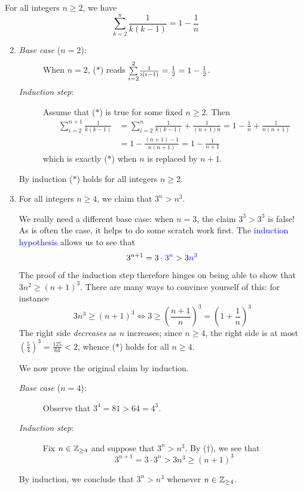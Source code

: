 \begin{examples}{}{}
	\exstart For all integers $n\ge 2$, we have\footnotemark
	\[
		\sum\limits_{k=2}^n\frac 1{k(k-1)} =1-\frac 1n\tag{$\ast$}
	\]	
	\begin{enumerate}\setcounter{enumi}{1}
		\item[]\begin{description}
			\item[\normalfont\emph{Base case} ($n=2$):] When $n=2$, ($\ast$) reads $\smash{\sum\limits_{i=2}^2}\frac 1{i(i-1)}=\frac 12=1-\frac 12$.
			\item[\normalfont\emph{Induction step}:] Assume that ($\ast$) is true for some fixed $n\ge 2$. Then
			\begin{align*}
				\sum_{i=2}^{n+1}\frac 1{k(k-1)} &=\sum_{i=2}^{n}\frac 1{k(k-1)}+\frac 1{(n+1)n} =1-\frac 1n+\frac 1{n(n+1)}\tag{induction hypothesis}\\
				&=1-\frac{(n+1)-1}{n(n+1)} =1-\frac 1{n+1}
			\end{align*}
			which is exactly ($\ast$) when $n$ is replaced by $n+1$.
		\end{description}
		By induction ($\ast$) holds for all integers $n\ge 2$.
	
	  \item For all integers $n\ge 4$, we claim that $3^n>n^3$.\par
	  We really need a different base case: when $n=3$, the claim $3^3>3^3$ is false! As is often the case, it helps to do some scratch work first. The \textcolor{blue}{induction hypothesis} allows us to see that 
	  \[
	  	3^{n+1}=3\cdot \textcolor{blue}{3^n} >3 \textcolor{blue}{n^3}
	  \] 
	  The proof of the induction step therefore hinges on being able to show that $3n^2\ge (n+1)^3$. There are many ways to convince yourself of this: for instance
	  \[
	  	3n^3\ge(n+1)^3\iff 3\ge\left(\frac{n+1}n\right)^3 =\left(1+\frac 1n\right)^3 \tag{$\dag$}
	  \]
	  The right side \emph{decreases} as $n$ increases; since $n\ge 4$, the right side is at most $\left(\frac 54\right)^3=\frac{125}{64}<2$, whence ($\ast$) holds for all $n\ge 4$.\smallbreak
	  
	  We now prove the original claim by induction.	  
	  \begin{description}
	  	\item[\normalfont\emph{Base case} ($n=4$):] Observe that $3^4=81>64=4^3$.
	  	\item[\normalfont\emph{Induction step}:] Fix $n\in\mathbb{Z}_{\ge 4}$ and suppose that $3^n>n^3$. By ($\dag$), we see that
			\[
				3^{n+1}=3\cdot 3^n>3n^3\ge (n+1)^3
			\]
	  \end{description}
	  By induction, we conclude that $3^n>n^3$ whenever $n\in\mathbb{Z}_{\ge 4}$.
	\end{enumerate}
\end{examples}


